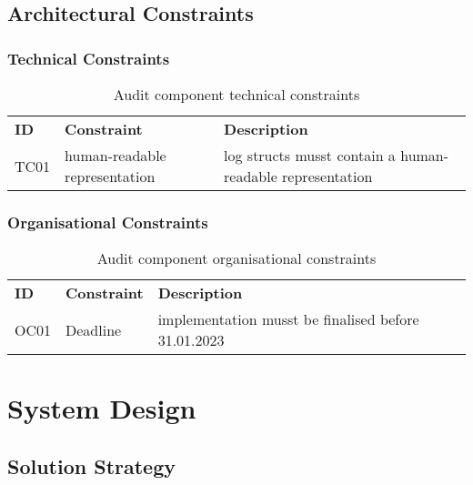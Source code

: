 \subsection{Architectural Constraints}

\subsubsection{Technical Constraints}

\begin{table}[H]
  \begin{center}
    \caption{Audit component technical constraints}
    \label{tab:actc}
    \def\arraystretch{1.5}
    \begin{tabularx}{\linewidth}{|l l X |}
      \hline
      \rowcolor{gray!20}
      \textbf{ID} & \textbf{Constraint} & \textbf{Description}\\
      TC01 & human-readable representation & log structs musst contain a human-readable representation\\
      \hline
    \end{tabularx}
  \end{center}
\end{table}

\subsubsection{Organisational Constraints}

\begin{table}[H]
  \begin{center}
    \caption{Audit component organisational constraints}
    \label{tab:acoc}
    \def\arraystretch{1.5}
    \begin{tabularx}{\linewidth}{|l l X |}
      \hline
      \rowcolor{gray!20}
      \textbf{ID} & \textbf{Constraint} & \textbf{Description}\\
      OC01 & Deadline & implementation musst be finalised before 31.01.2023\\
      \hline
    \end{tabularx}
  \end{center}
\end{table}

\section{System Design}

\subsection{Solution Strategy}

